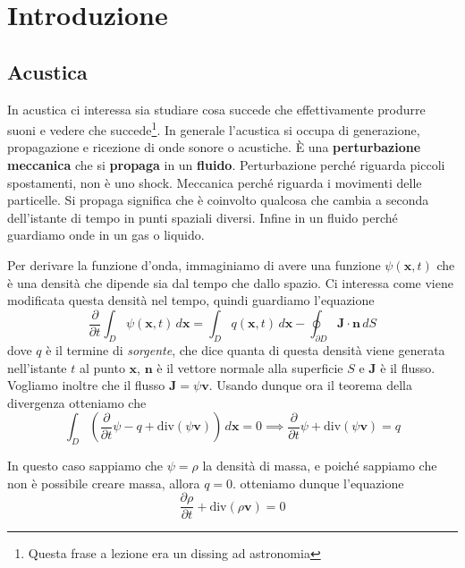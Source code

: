 \chapter{Introduzione}

\section{Acustica}

In acustica ci interessa sia studiare cosa succede che effettivamente produrre
suoni e vedere che succede\footnote{Questa frase a lezione era un dissing ad
astronomia}. In generale l'acustica si occupa di generazione, propagazione e
ricezione di onde sonore o acustiche. È una \textbf{perturbazione}
\textbf{meccanica} che si \textbf{propaga} in un \textbf{fluido}. Perturbazione
perché riguarda piccoli spostamenti, non è uno shock. Meccanica perché riguarda
i movimenti delle particelle. Si propaga significa che è coinvolto qualcosa che
cambia a seconda dell'istante di tempo in punti spaziali diversi. Infine in un
fluido perché guardiamo onde in un gas o liquido.

Per derivare la funzione d'onda, immaginiamo di avere una funzione \(\psi
{(\mathbf{x} , t)}\) che è una densità che dipende sia dal tempo che dallo
spazio. Ci interessa come viene modificata questa densità nel tempo, quindi
guardiamo l'equazione
\begin{equation}\label{eq:acu_onda_integrale}
  \frac{\partial}{\partial t}\int _D \psi {(\mathbf{x} , t)} \,d\mathbf{x} =
  \int _D q{(\mathbf{x} , t)} \,d\mathbf{x} - \oint _{\partial D} \mathbf{J}
  \cdot \mathbf{n} \,dS
\end{equation}
dove \(q\) è il termine di \emph{sorgente}, che dice quanta di questa densità
viene generata nell'istante \(t\) al punto \(\mathbf{x} \), \(\mathbf{n} \) è il
vettore normale alla superficie \(S\) e \(\mathbf{J} \) è il flusso. Vogliamo
inoltre che il flusso \(\mathbf{J} = \psi \mathbf{v} \). Usando dunque ora
il teorema della divergenza otteniamo che
\begin{equation}\label{eq:acu_div}
  \int _D {\left( \frac{\partial }{\partial t}\psi - q + \mathrm{div} {(\psi \mathbf{v}
  )}\right)}  \,d\mathbf{x} = 0 \implies \frac{\partial }{\partial t}\psi +
  \mathrm{div} {(\psi \mathbf{v})} = q
\end{equation}

In questo caso sappiamo che \(\psi = \rho\) la densità di massa, e poiché
sappiamo che non è possibile creare massa, allora \(q = 0\). otteniamo dunque
l'equazione
\begin{equation}\label{eq:acu_cont_massa}
  \frac{\partial \rho}{\partial t} + \mathrm{div}{(\rho \mathbf{v} )} = 0
\end{equation}

